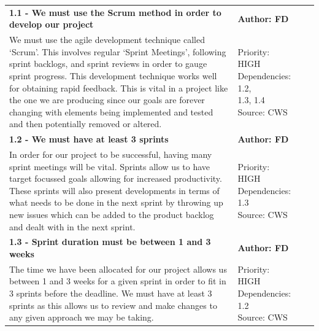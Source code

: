 \documentclass[10pt]{report}
\begin{document}
\begin{center}

\begin{longtable}{| p{13cm} | p{3cm} |}
\endfirsthead
\endlastfoot

\multicolumn{2}{c}{\textit{Continued from last page}}
\endhead

\multicolumn{2}{c}{\textit{Continued on next page}}
\endfoot

\hline
\multicolumn{2}{|l|}{\textbf{\textit{1 - Software Development Process}}} \\
\hline
\textbf{1.1 - We must use the Scrum method in order to develop our project} & \textbf{Author: FD} \\
\hline
We must use the agile development technique called ‘Scrum’. This involves regular ‘Sprint Meetings’, following sprint backlogs, and sprint reviews in order to gauge sprint progress. This development technique works well for obtaining rapid feedback. This is vital in a project like the one we are producing since our goals are forever changing with elements being implemented and tested and then potentially removed or altered.&
\makecell{Priority: HIGH\\Dependencies: 1.2,\\1.3, 1.4\\Source: CWS}\\
\hline
\textbf{1.2 - We must have at least 3 sprints} & \textbf{Author: FD} \\
\hline
In order for our project to be successful, having many sprint meetings will be vital. Sprints allow us to have target focussed goals allowing for increased productivity. These sprints will also present developments in terms of what needs to be done in the next sprint by throwing up new issues which can be added to the product backlog and dealt with in the next sprint.&
\makecell{Priority: HIGH\\Dependencies: 1.3\\Source: CWS} \\
\hline
\textbf{1.3 - Sprint duration must be between 1 and 3 weeks} & \textbf{Author: FD} \\
\hline
The time we have been allocated for our project allows us between 1 and 3 weeks for a given sprint in order to fit in 3 sprints before the deadline. We must have at least 3 sprints as this allows us to review and make changes to any given approach we may be taking.&
\makecell{Priority: HIGH\\Dependencies: 1.2\\Source: CWS} \\

\end{longtable}
\end{center}
\end{document}
